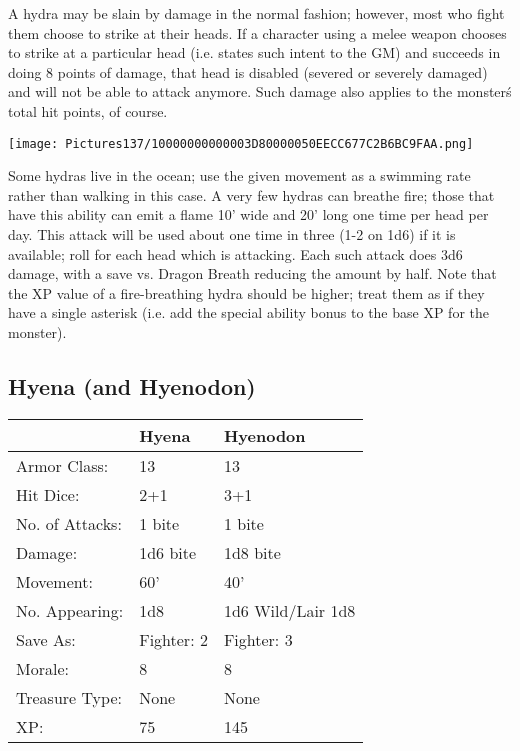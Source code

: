 \documentclass[a4paper,twoside,openany,10pt]{book}
\begin{document}
\begin{multicols}{2}
A hydra may be slain by damage in the normal fashion; however, most who fight them choose to strike at their heads. If a character using a melee weapon chooses to strike at a particular head (i.e. states such intent to the GM) and succeeds in doing 8 points of damage, that head is disabled (severed or severely damaged) and will not be able to attack anymore. Such damage also applies to the monster\'s total hit points, of course.

\begin{center}
	\texttt{[image: Pictures137/10000000000003D80000050EECC677C2B6BC9FAA.png]}
\end{center}

Some hydras live in the ocean; use the given movement as a swimming rate rather than walking in this case. A very few hydras can breathe fire; those that have this ability can emit a flame 10' wide and 20' long one time per head per day. This attack will be used about one time in three (1-2 on 1d6) if it is available; roll for each head which is attacking. Each such attack does 3d6 damage, with a save vs. Dragon Breath reducing the amount by half. Note that the XP value of a fire-breathing hydra should be higher; treat them as if they have a single asterisk (i.e. add the special ability bonus to the base XP for the monster).


\subsection*{Hyena (and Hyenodon)}\label{hyena-and-hyenodon}

\begin{tabularx}{0.50\textwidth}{@{}llX@{}}
& Hyena & Hyenodon \\\hline
Armor Class: & 13 & 13 \\\hline
Hit Dice: & 2+1 & 3+1 \\\hline
No. of Attacks: & 1 bite & 1 bite \\\hline
Damage: & 1d6 bite & 1d8 bite \\\hline
Movement: & 60' & 40' \\\hline
No. Appearing: & 1d8 & 1d6 Wild/Lair 1d8 \\\hline
Save As: & Fighter: 2 & Fighter: 3 \\\hline
Morale: & 8 & 8 \\\hline
Treasure Type: & None & None \\\hline
XP: & 75 & 145 \\\hline
\end{tabularx}\medskip


\end{multicols}
\end{document}
